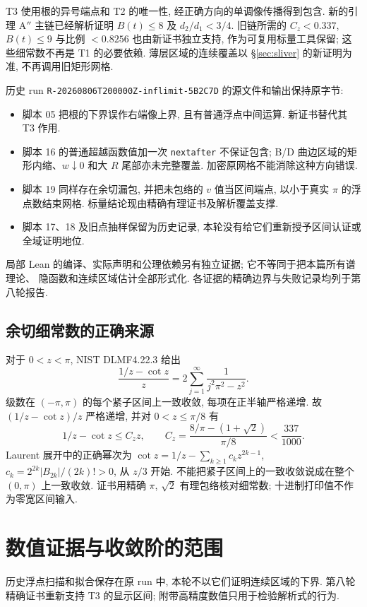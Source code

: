 \documentclass[UTF8]{ctexart}
\begin{document}
T3 使用根的异号端点和 T2 的唯一性, 经正确方向的单调像传播得到包含.
新的引理 A$''$ 主链已经解析证明 $B(t)\le8$ 及 $d_2/d_1<3/4$.
旧链所需的 $C_z<0.337$, $B(t)\le9$ 与比例 $<0.8256$ 也由新证书独立支持,
作为可复用标量工具保留; 这些细常数不再是 T1 的必要依赖.
薄层区域的连续覆盖以 §\ref{sec:sliver} 的新证明为准, 不再调用旧矩形网格.

历史 run \texttt{R-20260806T200000Z-inflimit-5B2C7D} 的源文件和输出保持原字节:
\begin{itemize}
 \item 脚本 05 把根的下界误作右端像上界, 且有普通浮点中间运算. 新证书替代其 T3 作用.
 \item 脚本 16 的普通超越函数值加一次 \texttt{nextafter} 不保证包含;
 B/D 曲边区域的矩形内缩、$w\downarrow0$ 和大 $R$ 尾部亦未完整覆盖.
 加密原网格不能消除这种方向错误.
 \item 脚本 19 同样存在余切漏包, 并把未包络的 $v$ 值当区间端点,
 以小于真实 $\pi$ 的浮点数结束网格. 标量结论现由精确有理证书及解析覆盖支撑.
 \item 脚本 17、18 及旧点抽样保留为历史记录, 本轮没有给它们重新授予区间认证或全域证明地位.
\end{itemize}
局部 Lean 的编译、实际声明和公理依赖另有独立证据; 它不等同于把本篇所有谱理论、
隐函数和连续区域估计全部形式化. 各证据的精确边界与失败记录均列于第八轮报告.

\subsection{余切细常数的正确来源}
对于 $0<z<\pi$, NIST DLMF4.22.3 给出
\[
 \frac{1/z-\cot z}{z}=2\sum_{j=1}^{\infty}\frac1{j^2\pi^2-z^2}.
\]
级数在 $(-\pi,\pi)$ 的每个紧子区间上一致收敛, 每项在正半轴严格递增.
故 $(1/z-\cot z)/z$ 严格递增, 并对 $0<z\le\pi/8$ 有
\[
 1/z-\cot z\le C_z z,\qquad
 C_z=\frac{8/\pi-(1+\sqrt2)}{\pi/8}<\frac{337}{1000}.
\]
Laurent 展开中的正确幂次为
$\cot z=1/z-\sum_{k\ge1}c_kz^{2k-1}$,
$c_k=2^{2k}|B_{2k}|/(2k)!>0$, 从 $z/3$ 开始.
不能把紧子区间上的一致收敛说成在整个 $(0,\pi)$ 上一致收敛.
证书用精确 $\pi$, $\sqrt2$ 有理包络核对细常数; 十进制打印值不作为零宽区间输入.

\section{数值证据与收敛阶的范围}\label{sec:numeric}

历史浮点扫描和拟合保存在原 run 中, 本轮不以它们证明连续区域的下界.
第八轮精确证书重新支持 T3 的显示区间; 附带高精度数值只用于检验解析式的行为.
\end{document}
